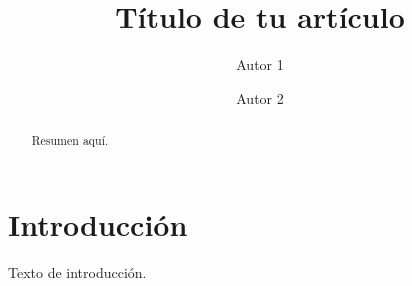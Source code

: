 \documentclass[sigconf]{acmart}
\title{Título de tu artículo}
\author{Autor 1}
\author{Autor 2}
\begin{document}
\begin{abstract}
Resumen aquí.
\end{abstract}

\maketitle

\section{Introducción}
Texto de introducción.



\end{document}
